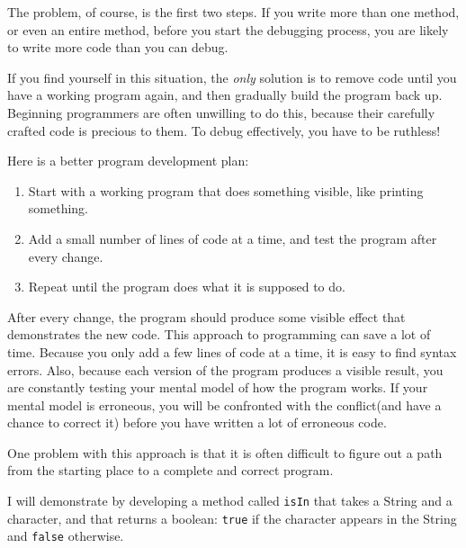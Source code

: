 \documentclass{book}
\begin{document}
The problem, of course, is the first two steps.  If you
write more than one method, or even an entire method, before
you start the debugging process, you are likely to write more
code than you can debug.

If you find yourself in this situation, the {\em only} solution
is to remove code until you have a working program again, and
then gradually build the program back up.  Beginning programmers
are often unwilling to do this, because their carefully crafted
code is precious to them.  To debug effectively, you have to
be ruthless!


Here is a better program development plan:

\begin{enumerate}

\item Start with a working program that does something visible,
   like printing something.

\item Add a small number of lines of code at a time,
   and test the program after every change.

\item Repeat until the program does what it is supposed to do.

\end{enumerate}

After every change, the program should produce some visible effect
that demonstrates the new code.  This approach to programming can save
a lot of time.  Because you only add a few lines of code at a time, it
is easy to find syntax errors.  Also, because each version of the
program produces a visible result, you are constantly testing your
mental model of how the program works.  If your mental model is
erroneous, you will be confronted with the conflict(and have a chance
to correct it) before you have written a lot of erroneous code.

One problem with this approach is that it is often
difficult to figure out a path from the starting place
to a complete and correct program.

I will demonstrate by developing a method called {\tt isIn} that takes
a String and a character, and that returns a boolean: {\tt true} if
the character appears in the String and {\tt false} otherwise.
\end{document}

